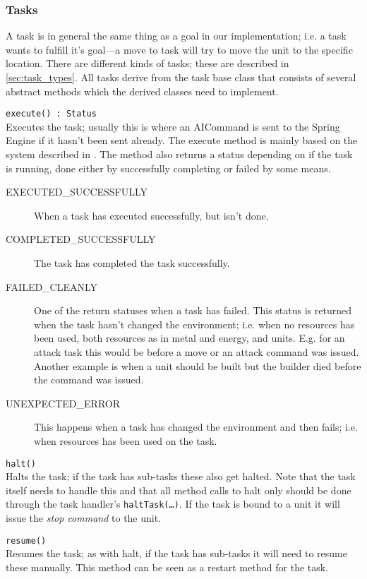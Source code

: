 \subsubsection{Tasks}
\label{sec:task}
A task is in general the same thing as a goal in our implementation; i.e. a task wants to fulfill
it's goal---a move to task will try to move the unit to the specific location. There are different
kinds of tasks; these are described in \ref{sec:task_types}. All tasks derive from the task base
class that consists of several abstract methods which the derived classes need to implement.
\begin{description}
  \item{\texttt{execute() : Status}} \\
  	Executes the task; usually this is where an AICommand is sent to the Spring Engine if it hasn't
  	been sent already. The execute method is mainly based on the system described in
  	\cite{Champandard08}. The method also returns a status depending on if the task is running, done
  	either by successfully completing or failed by some means.
  	\begin{description}
  	\item[EXECUTED\_SUCCESSFULLY] When a task has executed successfully, but isn't done. 
  	\item[COMPLETED\_SUCCESSFULLY] The task has completed the task successfully.
  	\item[FAILED\_CLEANLY] One of the return statuses when a task has failed. This status is returned
  	when the task hasn't changed the environment; i.e. when no resources has been used, both
  	resources as in metal and energy, and units. E.g. for an attack task this would be before a move
  	or an attack command was issued. Another example is when a unit should be built but the builder
  	died before the command was issued.
  	\item[UNEXPECTED\_ERROR] This happens when a task has changed the environment and then fails;
  	i.e. when resources has been used on the task.
  	\end{description}
  \item{\texttt{halt()}} \\
  	Halts the task; if the task has sub-tasks these also get halted. Note that the task itself needs
  	to handle this and that all method calls to halt only should be done through the task handler's
  	\texttt{haltTask(\ldots)}. If the task is bound to a unit it will issue the \emph{stop
  	command} to the unit.
  \item{\texttt{resume()}} \\
  	Resumes the task; as with halt, if the task has sub-tasks it will need to resume these manually.
  	This method can be seen as a restart method for the task.
\end{description}

